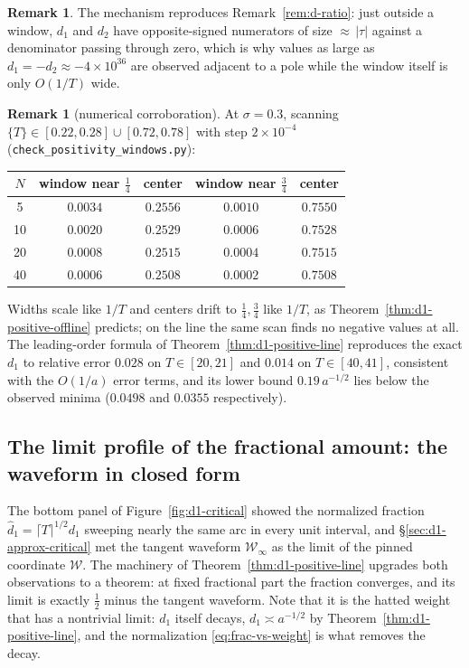 \documentclass[11pt]{article}
\theoremstyle{definition}
\newtheorem{remark}[theorem]{Remark}
\begin{document}
\begin{remark}
The mechanism reproduces Remark~\ref{rem:d-ratio}: just outside a window,
$d_1$ and $d_2$ have opposite-signed numerators of size ${\approx}\,|\tau|$
against a denominator passing through zero, which is why values as large as
$d_1=-d_2\approx-4\times10^{36}$ are observed adjacent to a pole while the
window itself is only $O(1/T)$ wide.
\end{remark}

\begin{remark}[numerical corroboration]
At $\sigma=0.3$, scanning $\{T\}\in[0.22,0.28]\cup[0.72,0.78]$ with step
$2\times10^{-4}$ (\texttt{check\_positivity\_windows.py}):
\begin{center}
\begin{tabular}{ccccc}
$N$ & window near $\tfrac14$ & center & window near $\tfrac34$ & center\\
\hline
5  & $0.0034$ & $0.2556$ & $0.0010$ & $0.7550$\\
10 & $0.0020$ & $0.2529$ & $0.0006$ & $0.7528$\\
20 & $0.0008$ & $0.2515$ & $0.0004$ & $0.7515$\\
40 & $0.0006$ & $0.2508$ & $0.0002$ & $0.7508$
\end{tabular}
\end{center}
Widths scale like $1/T$ and centers drift to $\tfrac14,\tfrac34$ like
$1/T$, as Theorem~\ref{thm:d1-positive-offline} predicts; on the line the
same scan finds no negative values at all. The leading-order formula of
Theorem~\ref{thm:d1-positive-line} reproduces the exact $d_1$ to relative
error $0.028$ on $T\in[20,21]$ and $0.014$ on $T\in[40,41]$, consistent
with the $O(1/a)$ error terms, and its lower bound $0.19\,a^{-1/2}$ lies
below the observed minima ($0.0498$ and $0.0355$ respectively).
\end{remark}

\subsection{The limit profile of the fractional amount: the waveform in closed form}\label{sec:d1-limit}

The bottom panel of Figure~\ref{fig:d1-critical} showed the normalized
fraction $\hat d_1=\lceil T\rceil^{1/2}d_1$ sweeping nearly the same arc in
every unit interval, and \S\ref{sec:d1-approx-critical} met the tangent
waveform $\mathcal{W}_{\infty}$ as the limit of the pinned coordinate
$\mathcal{W}$. The machinery of Theorem~\ref{thm:d1-positive-line} upgrades
both observations to a theorem: at fixed fractional part the fraction
converges, and its limit is exactly $\tfrac12$ minus the tangent waveform.
Note that it is the hatted weight that has a nontrivial limit: $d_1$ itself
decays, $d_1\asymp a^{-1/2}$ by Theorem~\ref{thm:d1-positive-line}, and the
normalization \eqref{eq:frac-vs-weight} is what removes the decay.
\end{document}
